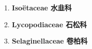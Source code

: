     \begin{enumerate}
      \item[] \begin{small}\textbf{Isoëtaceae 水韭科} \end{small}
        
      \item[] \begin{small}\textbf{Lycopodiaceae 石松科} \end{small}
        
      \item[] \begin{small}\textbf{Selaginellaceae 卷柏科} \end{small}
        
    \end{enumerate}
